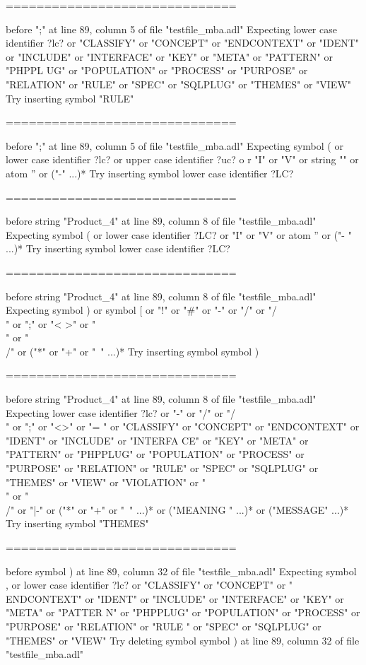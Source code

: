 \begin{description}
\begin{haskell}
==============================

before ";" at line 89, column 5 of file "testfile_mba.adl"
Expecting lower case identifier ?lc? or "CLASSIFY" or "CONCEPT" or "ENDCONTEXT"
or "IDENT" or "INCLUDE" or "INTERFACE" or "KEY" or "META" or "PATTERN" or "PHPPL
UG" or "POPULATION" or "PROCESS" or "PURPOSE" or "RELATION" or "RULE" or "SPEC"
or "SQLPLUG" or "THEMES" or "VIEW"
Try inserting symbol "RULE"

==============================

before ";" at line 89, column 5 of file "testfile_mba.adl"
Expecting symbol ( or lower case identifier ?lc? or upper case identifier ?uc? o
r "I" or "V" or string "" or atom '' or ("-" ...)*
Try inserting symbol lower case identifier ?LC?

==============================

before string "Product_4" at line 89, column 8 of file "testfile_mba.adl"
Expecting symbol ( or lower case identifier ?LC? or "I" or "V" or atom '' or ("-
" ...)*
Try inserting symbol lower case identifier ?LC?

==============================

before string "Product_4" at line 89, column 8 of file "testfile_mba.adl"
Expecting symbol ) or symbol [ or "!" or "#" or "-" or "/" or "/\\" or ";" or "<
>" or "\\" or "\\/" or ("*" or "+" or "~" ...)*
Try inserting symbol symbol )

==============================

before string "Product_4" at line 89, column 8 of file "testfile_mba.adl"
Expecting lower case identifier ?lc? or "-" or "/" or "/\\" or ";" or "<>" or "=
" or "CLASSIFY" or "CONCEPT" or "ENDCONTEXT" or "IDENT" or "INCLUDE" or "INTERFA
CE" or "KEY" or "META" or "PATTERN" or "PHPPLUG" or "POPULATION" or "PROCESS" or
 "PURPOSE" or "RELATION" or "RULE" or "SPEC" or "SQLPLUG" or "THEMES" or "VIEW"
or "VIOLATION" or "\\" or "\\/" or "|-" or ("*" or "+" or "~" ...)* or ("MEANING
" ...)* or ("MESSAGE" ...)*
Try inserting symbol "THEMES"

==============================

before symbol ) at line 89, column 32 of file "testfile_mba.adl"
Expecting symbol , or lower case identifier ?lc? or "CLASSIFY" or "CONCEPT" or "
ENDCONTEXT" or "IDENT" or "INCLUDE" or "INTERFACE" or "KEY" or "META" or "PATTER
N" or "PHPPLUG" or "POPULATION" or "PROCESS" or "PURPOSE" or "RELATION" or "RULE
" or "SPEC" or "SQLPLUG" or "THEMES" or "VIEW"
Try deleting symbol symbol ) at line 89, column 32 of file "testfile_mba.adl"


\end{haskell}
\end{description}
